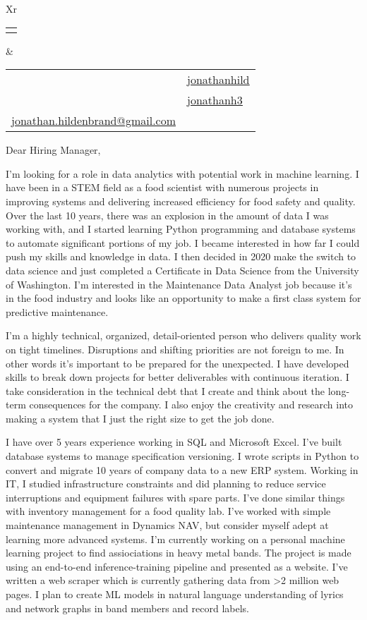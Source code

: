 \documentclass[letterpaper,12pt]{article}[leftmargin=*]
\makeatletter
\def\fullname{Jonathan Hildenbrand}
\def\githubicon{\faGithub}
\def\githublink{https://github.com/jonathanhild}
\def\githubtext{jonathanhild}
\def\linkedinicon{\faLinkedin}
\def\linkedinlink{https://linkedin.com/in/jonathanh3}
\def\linkedintext{jonathanh3}
\def\phoneicon{\faPhone}
\def\phonetext{+1-971-409-0695}
\def\emailicon{\faEnvelope}
\def\emaillink{mailto:jonathan.hildenbrand+resume@gmail.com}
\def\emailtext{jonathan.hildenbrand@gmail.com}
\def\locationicon{\faMapMarker}
\def\locationtext{Portland, Oregon}
\def\targeticon{\faBinoculars}
\def\targettext{Local \& Remote}
\def\headertype{\doublecol} %
\def\location{\hspace{3pt}\locationicon \hspace{5pt}{\color{links}\locationtext}}
\def\target{\targeticon\hspace{3pt}{\color{links}\targettext}}
\def\phone{\phoneicon\hspace{3pt}{\color{links}{\phonetext}}}
\def\linkedin{\linkedinicon\hspace{3pt}\href{\linkedinlink}{\underline{\linkedintext}}}
\def\email{\emailicon\hspace{3pt}\href{\emaillink}{\underline{\emailtext}}}
\def\github{\githubicon\hspace{3pt}\href{\githublink}{\underline{\githubtext}}}
\newcommand{\doublecol}[6]{
  \begin{tabularx}{\textwidth}{Xr}
    {
      \begin{tabular}[c]{l}
        \fontsize{24}{34}\selectfont{\color{primary}{{\textbf{\fullname}}}}
      \end{tabular}
    } & {
      \begin{tabular}[c]{l@{\hspace{1.5em}} l}
        {\small#4} & {\small#1} \\
        {\small#5} & {\small#2} \\
        {\small#6} & {\small#3}
      \end{tabular}
    }
  \end{tabularx}
}
\makeatother
\begin{document}
\headertype{\github}{\linkedin}{\phone}{\location}{\target}{\email} %

\vspace{48pt}

Dear Hiring Manager,

\vspace{24pt}

\hspace{24pt}
I'm looking for a role in data analytics with potential work in machine learning. I have been in a STEM field as a food scientist with numerous projects in improving systems and delivering increased efficiency for food safety and quality. Over the last 10 years, there was an explosion in the amount of data I was working with, and I started learning Python programming and database systems to automate significant portions of my job. I became interested in how far I could push my skills and knowledge in data. I then decided in 2020 make the switch to data science and just completed a Certificate in Data Science from the University of Washington.
I'm interested in the Maintenance Data Analyst job because it's in the food industry and looks like an opportunity to make a first class system for predictive maintenance.

\vspace{12pt}

\hspace{24pt}
I'm a highly technical, organized, detail-oriented person who delivers quality work on tight timelines. Disruptions and shifting priorities are not foreign to me. In other words it's important to be prepared for the unexpected. I have developed skills to break down projects for better deliverables with continuous iteration. I take consideration in the technical debt that I create and think about the long-term consequences for the company. I also enjoy the creativity and research into making a system that I just the right size to get the job done.

\vspace{12pt}

\hspace{24pt}
I have over 5 years experience working in SQL and Microsoft Excel. I've built database systems to manage specification versioning. I wrote scripts in Python to convert and migrate 10 years of company data to a new ERP system. Working in IT, I studied infrastructure constraints and did planning to reduce service interruptions and equipment failures with spare parts. I've done similar things with inventory management for a food quality lab. I've worked with simple maintenance management in Dynamics NAV, but consider myself adept at learning more advanced systems.
I'm currently working on a personal machine learning project to find assiociations in heavy metal bands. The project is made using an end-to-end inference-training pipeline and presented as a website. I've written a web scraper which is currently gathering data from >2 million web pages. I plan to create ML models in natural language understanding of lyrics and network graphs in band members and record labels.
\end{document}
